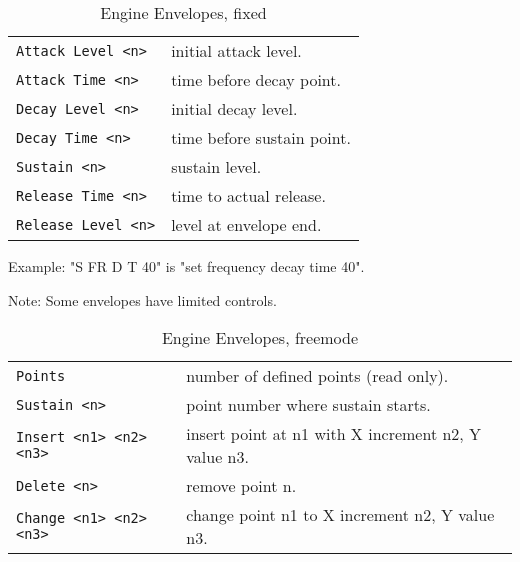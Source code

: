    \begin{table}[H]
      \centering
      \caption{Engine Envelopes, fixed}
      \label{table:yoshimi_engine_envelopes_fixed}
      \begin{tabular}{l l}
\texttt{Attack Level <n>} &
   initial attack level. \\
\texttt{Attack Time <n>} &
   time before decay point. \\
\texttt{Decay Level <n>} &
   initial decay level. \\
\texttt{Decay Time <n>} &
   time before sustain point. \\
\texttt{Sustain <n>} &
   sustain level. \\
\texttt{Release Time <n>} &
   time to actual release. \\
\texttt{Release Level <n>} &
   level at envelope end. \\
      \end{tabular}
   \end{table}

Example: "S FR D T 40" is "set frequency decay time 40".

Note: Some envelopes have limited controls.

   \begin{table}[H]
      \centering
      \caption{Engine Envelopes, freemode}
      \label{table:yoshimi_engine_envelopes_freemode}
      \begin{tabular}{l l}
\texttt{Points} &
   number of defined points (read only). \\
\texttt{Sustain <n>} &
   point number where sustain starts. \\
\texttt{Insert <n1> <n2> <n3>} &
   insert point at n1 with X increment n2, Y value n3. \\
\texttt{Delete <n>} &
   remove point n. \\
\texttt{Change <n1> <n2> <n3>} &
   change point n1 to X increment n2, Y value n3. \\
      \end{tabular}
   \end{table}

